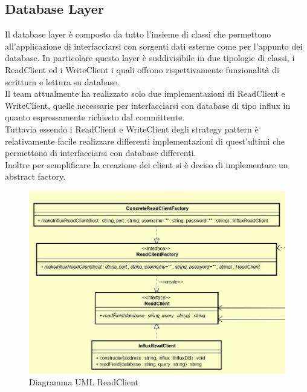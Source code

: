 \subsection{Database Layer}
Il database layer è composto da tutto l'insieme di classi che permettono all'applicazione di interfacciarsi con sorgenti dati esterne come per l'appunto dei database.
In particolare questo layer è suddivisibile in due tipologie di classi, i ReadClient ed i WriteClient i quali offrono rispettivamente funzionalità di scrittura e lettura su database.\\
Il team attualmente ha realizzato solo due implementazioni di ReadClient e WriteClient, quelle necessarie per interfacciarsi con database di tipo influx in quanto espressamente richiesto dal committente.\\
Tuttavia essendo i ReadClient e WriteClient degli strategy pattern è relativamente facile realizzare differenti implementazioni di quest'ultimi che permettono di interfacciarsi con database differenti.\\
Inoltre per semplificare la creazione dei client si è deciso di implementare un abstract factory.
\begin{figure} [H]
	\centering
	\includegraphics[scale=0.5]{Img/ReadClient}	
	\caption{Diagramma UML ReadClient}\label{}
\end{figure}
